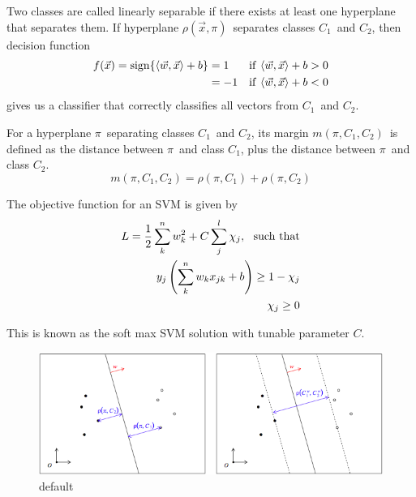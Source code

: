 \documentclass[11pt, oneside]{article}   	%
\newcommand{\vx}{\vec{x}}
\newcommand{\yj}{y_{j}}
\begin{document}
Two classes are called linearly separable if there exists at least one hyperplane that separates them. If hyperplane $\rho(\vx,\pi)$~separates classes $C_{1}$~and $C_{2}$, then decision function
\begin{eqnarray}
f(\vx) = {\rm{sign}}\{\langle \vec{w},\vx \rangle + b\}	&= 1 & {\rm{if}}~ \langle \vec{w},\vx \rangle + b > 0 \\
										&= -1 & {\rm{if}}~ \langle \vec{w},\vx \rangle + b < 0
\end{eqnarray}
gives us a classifier that correctly classifies all vectors from $C_{1}$~and $C_{2}$.

For a hyperplane $\pi$~separating classes $C_{1}$~and $C_{2}$, its margin $m(\pi, C_{1}, C_{2})$~is defined as the distance between $\pi$~and class $C_{1}$, plus the distance between $\pi$~and class $C_{2}$.
\begin{equation}
m(\pi, C_{1}, C_{2}) = \rho(\pi, C_{1}) + \rho(\pi, C_{2})
\end{equation}

The objective function for an SVM is given by
\begin{eqnarray}
L = \frac{1}{2} \sum_{k}^{n} w_{k}^{2} + C \sum_{j}^{l} \chi_{j},~~{\rm{such~that}} \\
\yj \left( \sum_{k}^{n} w_{k} x_{jk} + b \right) \ge 1 - \chi_{j} \\
\chi_{j} \ge 0
\end{eqnarray}

This is known as the soft max SVM solution with tunable parameter $C$.

\begin{figure}[htbp]
\begin{center}
\includegraphics[]{svm/svmDist.png}
\caption{default}
\label{default}
\end{center}
\end{figure}
\end{document}
